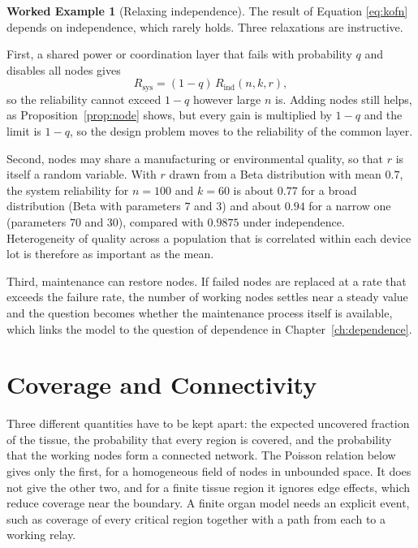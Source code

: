 \documentclass[11pt,openany]{book}
\theoremstyle{definition}
\newtheorem{example}{Worked Example}[chapter]
\theoremstyle{remark}
\begin{document}
\begin{example}[Relaxing independence]
\label{ex:correlated}
The result of Equation \eqref{eq:kofn} depends on independence, which rarely holds. Three relaxations are instructive.

First, a shared power or coordination layer that fails with probability $q$ and disables all nodes gives
\begin{equation}
R_{\mathrm{sys}}=(1-q)\,R_{\mathrm{ind}}(n,k,r),
\label{eq:common}
\end{equation}
so the reliability cannot exceed $1-q$ however large $n$ is. Adding nodes still helps, as Proposition~\ref{prop:node} shows, but every gain is multiplied by $1-q$ and the limit is $1-q$, so the design problem moves to the reliability of the common layer.

Second, nodes may share a manufacturing or environmental quality, so that $r$ is itself a random variable. With $r$ drawn from a Beta distribution with mean $0.7$, the system reliability for $n=100$ and $k=60$ is about $0.77$ for a broad distribution (Beta with parameters $7$ and $3$) and about $0.94$ for a narrow one (parameters $70$ and $30$), compared with $0.9875$ under independence. Heterogeneity of quality across a population that is correlated within each device lot is therefore as important as the mean.

Third, maintenance can restore nodes. If failed nodes are replaced at a rate that exceeds the failure rate, the number of working nodes settles near a steady value and the question becomes whether the maintenance process itself is available, which links the model to the question of dependence in Chapter~\ref{ch:dependence}.
\end{example}

\section{Coverage and Connectivity}

Three different quantities have to be kept apart: the expected uncovered fraction of the tissue, the probability that every region is covered, and the probability that the working nodes form a connected network. The Poisson relation below gives only the first, for a homogeneous field of nodes in unbounded space. It does not give the other two, and for a finite tissue region it ignores edge effects, which reduce coverage near the boundary. A finite organ model needs an explicit event, such as coverage of every critical region together with a path from each to a working relay.
\end{document}
